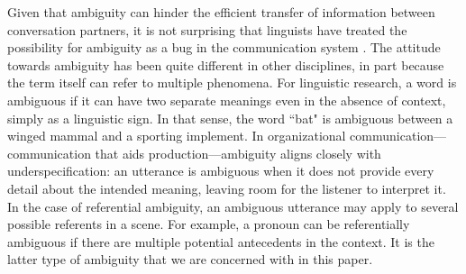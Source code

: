\documentclass[10pt,a4paper]{article}
\newcommand{\gcs}[1]{\textcolor{blue}{[gcs: #1]}}
\begin{document}
Given that ambiguity can hinder the efficient transfer of information between conversation partners, it is not surprising that linguists have treated the possibility for ambiguity as a bug in the communication system \cite{grice1975,chomsky2002minimalism}. The attitude towards ambiguity has been quite different in other disciplines, in part because the term itself can refer to multiple phenomena. For linguistic research, a word is ambiguous if it can have two separate meanings even in the absence of context, simply as a linguistic sign. In that sense, the word ``bat" is ambiguous between a winged mammal and a sporting implement. In organizational communication---communication that aids production---ambiguity aligns closely with underspecification: an utterance is ambiguous when it does not provide every detail about the intended meaning, leaving room for the listener to interpret it. In the case of referential ambiguity, an ambiguous utterance may apply to several possible referents in a scene. For example, a pronoun can be referentially ambiguous if there are multiple potential antecedents in the context. It is the latter type of ambiguity that we are concerned with in this paper.

%
%
\end{document}

